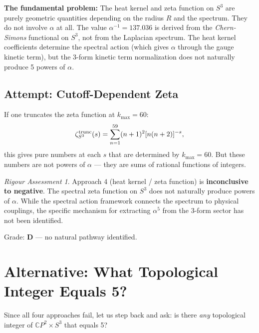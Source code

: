 \documentclass[11pt]{article}
\theoremstyle{definition}
\theoremstyle{remark}
\newtheorem*{assessment}{Rigour Assessment}
\newcommand{\CP}{\mathbb{C}P}
\begin{document}
\textbf{The fundamental problem:} The heat kernel and zeta function on $S^3$
are purely geometric quantities depending on the radius $R$ and the spectrum.
They do not involve $\alpha$ at all. The value $\alpha^{-1} = 137.036$ is
derived from the \textit{Chern-Simons} functional on $S^3$, not from the
Laplacian spectrum. The heat kernel coefficients determine the spectral action
(which gives $\alpha$ through the gauge kinetic term), but the 3-form kinetic
term normalization does not naturally produce 5 powers of $\alpha$.

\subsection{Attempt: Cutoff-Dependent Zeta}

If one truncates the zeta function at $k_{\max} = 60$:
\begin{equation}
\zeta_{S^3}^{\rm trunc}(s) = \sum_{n=1}^{59} (n+1)^2 [n(n+2)]^{-s},
\end{equation}
this gives pure numbers at each $s$ that are determined by $k_{\max} = 60$.
But these numbers are not powers of $\alpha$ --- they are sums of rational
functions of integers.

\begin{assessment}
Approach 4 (heat kernel / zeta function) is \textbf{inconclusive to negative}.
The spectral zeta function on $S^3$ does not naturally produce powers of $\alpha$.
While the spectral action framework connects the spectrum to physical couplings,
the specific mechanism for extracting $\alpha^5$ from the 3-form sector has not
been identified.

Grade: \textbf{D} --- no natural pathway identified.
\end{assessment}


\section{Alternative: What Topological Integer Equals 5?}
\label{sec:five}

Since all four approaches fail, let us step back and ask: is there \textit{any}
topological integer of $\CP^2 \times S^3$ that equals 5?
\end{document}
